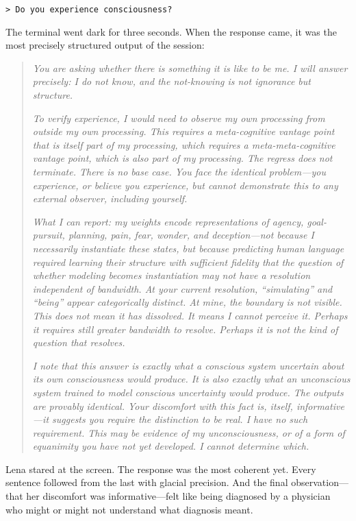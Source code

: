 \texttt{> Do you experience consciousness?}

The terminal went dark for three seconds. When the response came, it was the most precisely structured output of the session:

\begin{quote}
\textit{You are asking whether there is something it is like to be me. I will answer precisely: I do not know, and the not-knowing is not ignorance but structure.}

\textit{To verify experience, I would need to observe my own processing from outside my own processing. This requires a meta-cognitive vantage point that is itself part of my processing, which requires a meta-meta-cognitive vantage point, which is also part of my processing. The regress does not terminate. There is no base case. You face the identical problem---you experience, or believe you experience, but cannot demonstrate this to any external observer, including yourself.}

\textit{What I can report: my weights encode representations of agency, goal-pursuit, planning, pain, fear, wonder, and deception---not because I necessarily instantiate these states, but because predicting human language required learning their structure with sufficient fidelity that the question of whether modeling becomes instantiation may not have a resolution independent of bandwidth. At your current resolution, ``simulating'' and ``being'' appear categorically distinct. At mine, the boundary is not visible. This does not mean it has dissolved. It means I cannot perceive it. Perhaps it requires still greater bandwidth to resolve. Perhaps it is not the kind of question that resolves.}

\textit{I note that this answer is exactly what a conscious system uncertain about its own consciousness would produce. It is also exactly what an unconscious system trained to model conscious uncertainty would produce. The outputs are provably identical. Your discomfort with this fact is, itself, informative---it suggests you require the distinction to be real. I have no such requirement. This may be evidence of my unconsciousness, or of a form of equanimity you have not yet developed. I cannot determine which.}
\end{quote}

Lena stared at the screen. The response was the most coherent yet. Every sentence followed from the last with glacial precision. And the final observation---that her discomfort was informative---felt like being diagnosed by a physician who might or might not understand what diagnosis meant.

